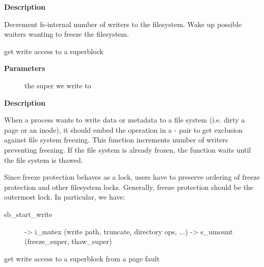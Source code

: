 \documentclass[a4paper,8pt,english]{sphinxmanual}
\begin{document}
\textbf{Description}

Decrement fs-internal number of writers to the filesystem.  Wake up possible
waiters wanting to freeze the filesystem.

\begin{fulllineitems}
\label{filesystems/index:c.sb_start_write}
get write access to a superblock

\end{fulllineitems}


\textbf{Parameters}
\begin{description}
\item[{}] \leavevmode
the super we write to

\end{description}

\textbf{Description}

When a process wants to write data or metadata to a file system (i.e. dirty
a page or an inode), it should embed the operation in a {\hyperref[filesystems/index:c.sb_start_write]{\emph{}}} -
{\hyperref[filesystems/index:c.sb_end_write]{\emph{}}} pair to get exclusion against file system freezing. This
function increments number of writers preventing freezing. If the file
system is already frozen, the function waits until the file system is
thawed.

Since freeze protection behaves as a lock, users have to preserve
ordering of freeze protection and other filesystem locks. Generally,
freeze protection should be the outermost lock. In particular, we have:
\begin{description}
\item[{sb\_start\_write}] \leavevmode
-\textgreater{} i\_mutex                 (write path, truncate, directory ops, ...)
-\textgreater{} s\_umount                (freeze\_super, thaw\_super)

\end{description}

\begin{fulllineitems}
\label{filesystems/index:c.sb_start_pagefault}
get write access to a superblock from a page fault

\end{fulllineitems}
\end{document}
